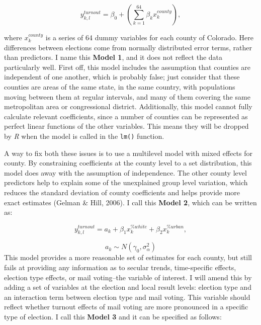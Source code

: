 \documentclass[12pt,twoside]{reedthesis}
\begin{document}
  \begin{equation} \tag{Model 1}
  y^{turnout}_{k,l} = \beta_0 + (\sum_{k=1}^{64}\beta_kx_k^{county}),
  \end{equation}
  
  where \(x_k^{county}\) is a series of 64 dummy variables for each county
  of Colorado. Here differences between elections come from normally
  distributed error terms, rather than predictors. I name this
  \textbf{Model 1}, and it does not reflect the data particularly well.
  First off, this model includes the assumption that counties are
  independent of one another, which is probably false; just consider that
  these counties are areas of the same state, in the same country, with
  populations moving between them at regular intervals, and many of them
  covering the same metropolitan area or congressional district.
  Additionally, this model cannot fully calculate relevant coefficients,
  since a number of counties can be represented as perfect linear
  functions of the other variables. This means they will be dropped by
  \textit{R} when the model is called in the \texttt{lm()} function.
  
  A way to fix both these issues is to use a multilevel model with mixed
  effects for county. By constraining coefficients at the county level to
  a set distribution, this model does away with the assumption of
  independence. The other county level predictors help to explain some of
  the unexplained group level variation, which reduces the standard
  deviation of county coefficients and helps provide more exact estimates
  (Gelman \& Hill, 2006). I call this \textbf{Model 2}, which can be
  written as:
  
  \begin{equation} \tag{Model 2}
  y^{turnout}_{k,l} = a_{k} + \beta_{1}x_k^{\%white} + \beta_{2}x_k^{\%urban},
  \end{equation}
  
  \[a_{k} \sim N (\gamma_0, \sigma_{\alpha}^2)\] This model provides a
  more reasonable set of estimates for each county, but still fails at
  providing any information as to secular trends, time-specific effects,
  election type effects, or mail voting--the variable of interest. I will
  amend this by adding a set of variables at the election and local result
  levels: election type and an interaction term between election type and
  mail voting. This variable should reflect whether turnout effects of
  mail voting are more pronounced in a specific type of election. I call
  this \textbf{Model 3} and it can be specified as follows:
  
\end{document}
